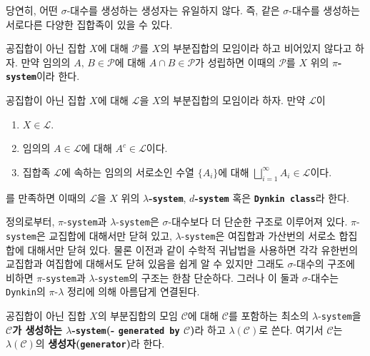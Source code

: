 당연히, 어떤 $\sigma$-대수를 생성하는 생성자는 유일하지 않다. 즉, 같은 $\sigma$-대수를 생성하는 서로다른 다양한 집합족이 있을 수 있다.

\begin{definition}
    공집합이 아닌 집합 $X$에 대해 $\mathcal{P}$를 $X$의 부분집합의 모임이라 하고 비어있지 않다고 하자. 만약 임의의 $A,\,B\in\mathcal{P}$에 대해 $A\cap B\in\mathcal{P}$가 성립하면 이때의 $\mathcal{P}$를 $X$ 위의 \textbf{$\pi$-\texttt{system}}이라 한다.
\end{definition}

\begin{definition}\label{def:lambdaSys}
    공집합이 아닌 집합 $X$에 대해 $\mathcal{L}$을 $X$의 부분집합의 모임이라 하자. 만약 $\mathcal{L}$이
    \begin{enumerate}
        \item $X\in\mathcal{L}$.
        \item 임의의 $A\in\mathcal{L}$에 대해 $A^c\in\mathcal{L}$이다.
        \item 집합족 $\mathcal{L}$에 속하는 임의의 서로소인 수열 $\{A_i\}$에 대해 $\bigsqcup_{i=1}^\infty A_i\in\mathcal{L}$이다.
    \end{enumerate}
    를 만족하면 이때의 $\mathcal{L}$을 $X$ 위의 \textbf{$\lambda$-\texttt{system}}, \textbf{$d$-\texttt{system}} 혹은 \textbf{\texttt{Dynkin class}}라 한다.\footnotemark
\end{definition}

정의로부터, $\pi$-\texttt{system}과 $\lambda$-\texttt{system}은 $\sigma$-대수보다 더 단순한 구조로 이루어져 있다. $\pi$-\texttt{system}은 교집합에 대해서만 닫혀 있고, $\lambda$-\texttt{system}은 여집합과 가산번의 서로소 합집합에 대해서만 닫혀 있다. 물론 이전과 같이 수학적 귀납법을 사용하면 각각 유한번의 교집합과 여집합에 대해서도 닫혀 있음을 쉽게 알 수 있지만 그래도 $\sigma$-대수의 구조에 비하면 $\pi$-\texttt{system}과 $\lambda$-\texttt{system}의 구조는 한참 단순하다. 그러나 이 둘과 $\sigma$-대수는 \texttt{Dynkin}의 $\pi$-$\lambda$ 정리에 의해 아름답게 연결된다.

\begin{definition}
    공집합이 아닌 집합 $X$의 부분집합의 모임 $\mathcal{C}$에 대해 $\mathcal{C}$를 포함하는 최소의 $\lambda$-\texttt{system}을 \textbf{$\mathcal{C}$가 생성하는 $\lambda$-\texttt{system}(- \texttt{generated by} $\mathcal{C}$)}라 하고 $\lambda(\mathcal{C})$로 쓴다. 여기서 $\mathcal{C}$는 $\lambda(\mathcal{C})$의 \textbf{생성자(\texttt{generator})}라 한다.
\end{definition}

